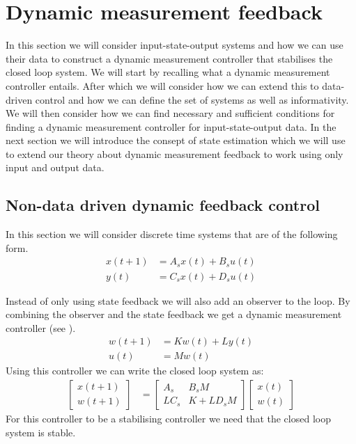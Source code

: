 \section{Dynamic measurement feedback}
In this section we will consider input-state-output systems and how we can use their data to construct a dynamic measurement controller that stabilises the closed loop system. We will start by recalling what a dynamic measurement controller entails. After which we will consider how we can extend this to data-driven control and how we can define the set of systems as well as informativity. We will then consider how we can find necessary and sufficient conditions for finding a dynamic measurement controller for input-state-output data. In the next section we will introduce the consept of state estimation which we will use to extend our theory about dynamic measurement feedback to work using only input and output data.

\subsection{Non-data driven dynamic feedback control}
In this section we will consider discrete time systems that are of the following form.
\begin{subequations}\label{outputSys}
	\begin{align} 
		x(t+1) &= A_s x(t) + B_s u(t) \\
		y(t)   &= C_s x(t) + D_s u(t)
	\end{align}
\end{subequations}

Instead of only using state feedback we will also add an observer to the loop. By combining the observer and the state feedback we get a dynamic measurement controller (see \cite[section 3.12]{bookTrentelman}).
\begin{align*}
	w(t+1) &= Kw(t) + Ly(t) \\
	u(t)   &= Mw(t)
\end{align*}
Using this controller we can write the closed loop system as:
\begin{align*}
	\begin{bmatrix}
		x(t+1) \\ w(t+1)
	\end{bmatrix}
	&=
	\begin{bmatrix}
		A_s  & B_s M \\ LC_s & K + LD_s M
	\end{bmatrix}
	\begin{bmatrix}
		x(t) \\ w(t)
	\end{bmatrix}
\end{align*}
For this controller to be a stabilising controller we need that the closed loop system is stable.

